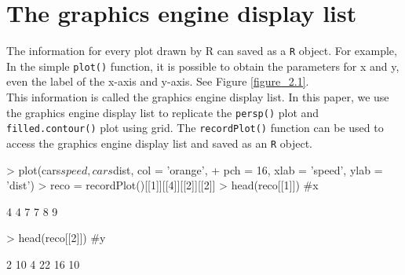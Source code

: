 \documentclass[paper=a4, fontsize=11pt]{report}
\begin{document}
\chapter{The graphics engine display list}
The information for every plot drawn by R can saved as a \texttt{R} object. For example, In the simple \texttt{plot()} function, it is possible to obtain the parameters for x and y, even the label of the x-axis and y-axis. See Figure \ref{figure_2.1}.\\

This information is called the graphics engine display list. In this paper, we use the graphics engine display list to replicate the \texttt{persp()} plot and \texttt{filled.contour()} plot using grid. The \texttt{recordPlot()} function can be used to access the graphics engine display list and saved as an \texttt{R} object.

\begin{Schunk}
\begin{Sinput}
> plot(cars$speed, cars$dist, col = 'orange', 
+       pch = 16, xlab = 'speed', ylab = 'dist')
> reco = recordPlot()[[1]][[4]][[2]][[2]]
> head(reco[[1]]) #x
\end{Sinput}
\begin{Soutput}
[1] 4 4 7 7 8 9
\end{Soutput}
\begin{Sinput}
> head(reco[[2]]) #y
\end{Sinput}
\begin{Soutput}
[1]  2 10  4 22 16 10
\end{Soutput}
\end{Schunk}
\end{document}
